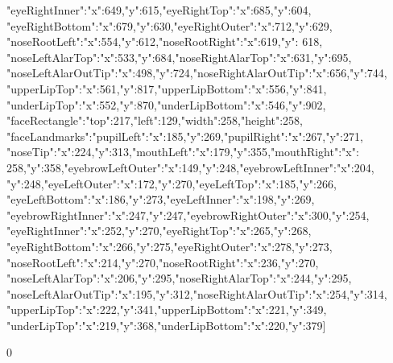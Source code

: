 \begin{myverbbox}[\footnotesize]{\vinput}
{{"eyeRightInner":{"x":649,"y":615},"eyeRightTop":{"x":685,"y":604},
"eyeRightBottom":{"x":679,"y":630},"eyeRightOuter":{"x":712,"y":629},
"noseRootLeft":{"x":554,"y":612},"noseRootRight":{"x":619,"y": 618},
"noseLeftAlarTop":{"x":533,"y":684},"noseRightAlarTop":{"x":631,"y":695},
"noseLeftAlarOutTip":{"x":498,"y":724},"noseRightAlarOutTip":{"x":656,"y":744},
"upperLipTop":{"x":561,"y":817},"upperLipBottom":{"x":556,"y":841},
"underLipTop":{"x":552,"y":870},"underLipBottom":{"x":546,"y":902}}},
{"faceRectangle":{"top":217,"left":129,"width":258,"height":258},
"faceLandmarks":{"pupilLeft":{"x":185,"y":269},"pupilRight":{"x":267,"y":271},
"noseTip":{"x":224,"y":313},"mouthLeft":{"x":179,"y":355},"mouthRight":{"x":
258,"y":358},"eyebrowLeftOuter":{"x":149,"y":248},"eyebrowLeftInner":{"x":204,
"y":248},"eyeLeftOuter":{"x":172,"y":270},"eyeLeftTop":{"x":185,"y":266},
"eyeLeftBottom":{"x":186,"y":273},"eyeLeftInner":{"x":198,"y":269},
"eyebrowRightInner":{"x":247,"y":247},"eyebrowRightOuter":{"x":300,"y":254},
"eyeRightInner":{"x":252,"y":270},"eyeRightTop":{"x":265,"y":268},
"eyeRightBottom":{"x":266,"y":275},"eyeRightOuter":{"x":278,"y":273},
"noseRootLeft":{"x":214,"y":270},"noseRootRight":{"x":236,"y":270},
"noseLeftAlarTop":{"x":206,"y":295},"noseRightAlarTop":{"x":244,"y":295},
"noseLeftAlarOutTip":{"x":195,"y":312},"noseRightAlarOutTip":{"x":254,"y":314},
"upperLipTop":{"x":222,"y":341},"upperLipBottom":{"x":221,"y":349},
"underLipTop":{"x":219,"y":368},"underLipBottom":{"x":220,"y":379}}}]
\end{myverbbox}
\begin{myverbbox}[\footnotesize]{\voutput}
0
\end{myverbbox}

